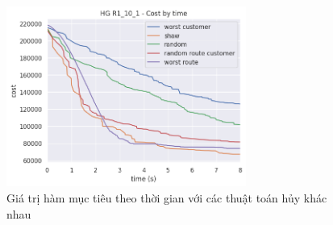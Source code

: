 \begin{figure}[H] %
	\centering %
	\includegraphics[width=0.7\textwidth]{figures/cost_time_des_10s_R1_10_1.png}
	\caption{Giá trị hàm mục tiêu theo thời gian với các thuật toán hủy khác nhau}
	\label{fig:cost_des_01}
\end{figure}